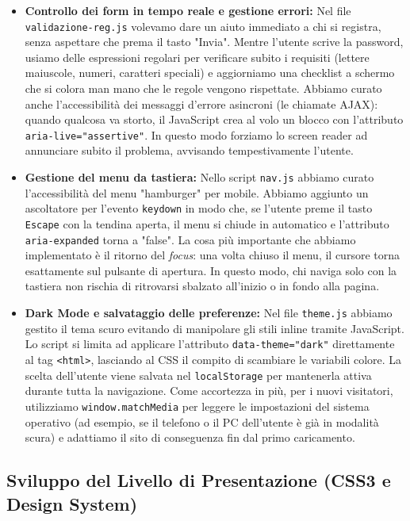 \documentclass[11pt,a4paper]{article}
\begin{document}
\begin{itemize}
    \item \textbf{Controllo dei form in tempo reale e gestione errori:} Nel file \texttt{validazione-reg.js} volevamo dare un aiuto immediato a chi si registra, senza aspettare che prema il tasto "Invia". Mentre l'utente scrive la password, usiamo delle espressioni regolari per verificare subito i requisiti (lettere maiuscole, numeri, caratteri speciali) e aggiorniamo una checklist a schermo che si colora man mano che le regole vengono rispettate. Abbiamo curato anche l'accessibilità dei messaggi d'errore asincroni (le chiamate AJAX): quando qualcosa va storto, il JavaScript crea al volo un blocco con l'attributo \texttt{aria-live="assertive"}. In questo modo forziamo lo screen reader ad annunciare subito il problema, avvisando tempestivamente l'utente.    
    \item \textbf{Gestione del menu da tastiera:} Nello script \texttt{nav.js} abbiamo curato l'accessibilità del menu "hamburger" per mobile. Abbiamo aggiunto un ascoltatore per l'evento \texttt{keydown} in modo che, se l'utente preme il tasto \texttt{Escape} con la tendina aperta, il menu si chiude in automatico e l'attributo \texttt{aria-expanded} torna a "false". La cosa più importante che abbiamo implementato è il ritorno del \textit{focus}: una volta chiuso il menu, il cursore torna esattamente sul pulsante di apertura. In questo modo, chi naviga solo con la tastiera non rischia di ritrovarsi sbalzato all'inizio o in fondo alla pagina.    
    \item \textbf{Dark Mode e salvataggio delle preferenze:} Nel file \texttt{theme.js} abbiamo gestito il tema scuro evitando di manipolare gli stili inline tramite JavaScript. Lo script si limita ad applicare l'attributo \texttt{data-theme="dark"} direttamente al tag \texttt{<html>}, lasciando al CSS il compito di scambiare le variabili colore. La scelta dell'utente viene salvata nel \texttt{localStorage} per mantenerla attiva durante tutta la navigazione. Come accortezza in più, per i nuovi visitatori, utilizziamo \texttt{window.matchMedia} per leggere le impostazioni del sistema operativo (ad esempio, se il telefono o il PC dell'utente è già in modalità scura) e adattiamo il sito di conseguenza fin dal primo caricamento.
\end{itemize}

\subsection{Sviluppo del Livello di Presentazione (CSS3 e Design System)}
\end{document}

